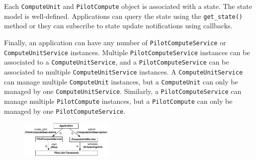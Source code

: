 \documentclass[conference]{IEEEtran}
\begin{document}


Each \texttt{Compute\-Unit} and \texttt{Pilot\-Compute} object is associated
with a state.
The state model is well-defined.
Applications can query the state using the \texttt{get\_state()} method or 
they can subscribe to state update notifications using callbacks.

Finally, an application can have any number of \texttt{Pilot\-Compute\-Service} or
\texttt{Compute\-Unit\-Service} instances.
Multiple \texttt{Pilot\-Compute\-Service} instances can be associated to a
\texttt{Compute\-Unit\-Service}, and a \texttt{Pilot\-Compute\-Service} can be associated to
multiple \texttt{Compute\-Unit\-Service} instances.
A \texttt{Compute\-Unit\-Service} can manage multiple \texttt{Compute\-Unit}
instances, but a \texttt{Compute\-Unit} can only be managed by one
\texttt{Compute\-Unit\-Service}.
Similarly, a \texttt{Pilot\-Compute\-Service} can manage multiple
\texttt{Pilot\-Compute} instances, but a \texttt{Pilot\-Compute} can only be
managed by one \texttt{Pilot\-Compute\-Service}.


\begin{figure}[t]
	\centering
  \upp\up\upp
		\includegraphics[width=0.4\textwidth]{../figures/pilot-api-flow.pdf}
	\caption{}
	\label{fig:figures_pilot_api_flow}
\end{figure}
\end{document}
